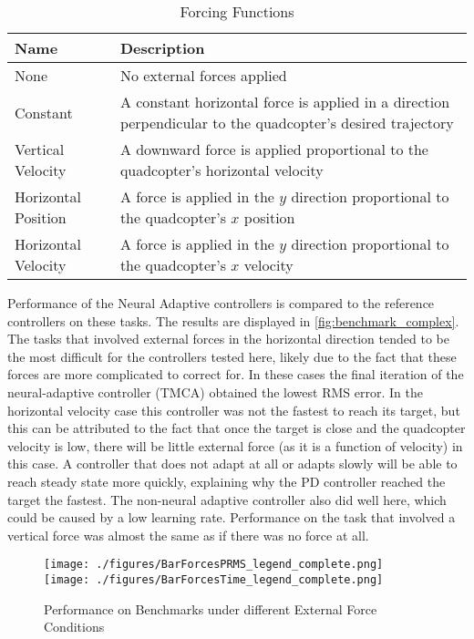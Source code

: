 \documentclass[letterpaper,12pt,titlepage,oneside,final]{book}
\begin{document}
\begin{table}
\caption{Forcing Functions} \label{table:forcingfunctions}
\begin{center}
\begin{tabular}{| l | p{9cm} |}
\hline
\textbf{Name} & \textbf{Description} \\ \hline
None & No external forces applied \\ \hline
Constant & A constant horizontal force is applied in a direction perpendicular to the quadcopter's desired trajectory\\ \hline
Vertical Velocity & A downward force is applied proportional to the quadcopter's horizontal velocity \\ \hline
Horizontal Position & A force is applied in the $y$ direction proportional to the quadcopter's $x$ position \\ \hline
Horizontal Velocity & A force is applied in the $y$ direction proportional to the quadcopter's $x$ velocity \\ \hline
\end{tabular}
\end{center}
\end{table}

Performance of the Neural Adaptive controllers is compared to the reference controllers on these tasks.
The results are displayed in \autoref{fig:benchmark_complex}.
The tasks that involved external forces in the horizontal direction tended to be the most difficult for the controllers tested here, likely due to the fact that these forces are more complicated to correct for.
In these cases the final iteration of the neural-adaptive controller (TMCA) obtained the lowest RMS error.
In the horizontal velocity case this controller was not the fastest to reach its target, but this can be attributed to the fact that once the target is close and the quadcopter velocity is low, there will be little external force (as it is a function of velocity) in this case. 
A controller that does not adapt at all or adapts slowly will be able to reach steady state more quickly, explaining why the PD controller reached the target the fastest.
The non-neural adaptive controller also did well here, which could be caused by a low learning rate.
Performance on the task that involved a vertical force was almost the same as if there was no force at all. 

\begin{figure}
\centering
\texttt{[image: ./figures/BarForcesPRMS\_legend\_complete.png]}
\texttt{[image: ./figures/BarForcesTime\_legend\_complete.png]}

\caption{Performance on Benchmarks under different External Force Conditions}
\label{fig:benchmark_complex}
\captionsetup{singlelinecheck=off,font=footnotesize}
\caption*{}
\end{figure}
\end{document}
